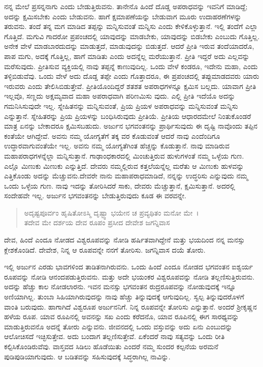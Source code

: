ನನ್ನ ಮೇಲೆ ಪ್ರಸನ್ನನಾಗು ಎಂದು ಬೇಡುತ್ತಿರುವನು. ತಾನೇನೊ ಹಿಂದೆ ದೊಡ್ಡ ಅಪರಾಧವನ್ನು ಇವನಿಗೆ ಮಾಡಿದ್ದೆ; ಅದನ್ನು ಕ್ಷಮಿಸಬೇಕು ಎಂದು ಬೇಡುವನು. ಹಾಗೆ ಕ್ಷಮಾಪಣೆಯನ್ನು ಬೇಡುವಾಗ ಮೂರು ಉದಾಹರಣೆಗಳನ್ನು ತರುವನು. ತಂದೆ ತನ್ನ ಮಗ ಮಾಡಿದ ತಪ್ಪನ್ನು ಮನ್ನಿಸುವಂತೆ ಮನ್ನಿಸು ಎಂದು ಕೇಳಿಕೊಳ್ಳುತ್ತಾನೆ. ಇಲ್ಲಿ ತಂದೆಗೆ ಎಲ್ಲಾ ಗೊತ್ತಿದೆ. ಮಗುವಿ ಗಾದರೋ ಪ್ರಪಂಚದಲ್ಲಿ ಯಾವುದನ್ನು ಮಾಡಬೇಕು, ಯಾವುದನ್ನು ಬಿಡಬೇಕು ಎಂಬುದು ಗೊತ್ತಿಲ್ಲ. ಅನೇಕ ವೇಳೆ ಮಾಡಬಾರದುದನ್ನು ಮಾಡುತ್ತದೆ, ಮಾಡುವುದನ್ನು ಬಿಡುತ್ತದೆ. ಆದರೆ ಪ್ರೀತಿ ಇರುವ ತಂದೆಯಾದರೊ, ಪಾಪ ಮಗು, ಅದಕ್ಕೆ ಗೊತ್ತಿಲ್ಲ, ಹಾಗೆ ಮಾಡಿತು ಎಂದು ಅದನ್ನೆಲ್ಲ ಮರೆಯುತ್ತಾನೆ. ಪ್ರೀತಿ ಇದ್ದರೆ ಅದು ಎಲ್ಲವನ್ನು ಮರೆಸುವುದು. ಪ್ರೀತಿಸುವ ವ್ಯಕ್ತಿಯಲ್ಲಿ ನಾವು ತಪ್ಪನ್ನೆ ಕಾಣುವುದಿಲ್ಲ. ಒಂದು ವೇಳೆ ಕಂಡರೂ, ಇದೇನು ಮಹಾ, ಎಂದು ತಳ್ಳಿಬಿಡುವೆವು. ಒಂದು ವೇಳೆ ಅದು ದೊಡ್ಡ ತಪ್ಪೇ ಎಂದು ಗೊತ್ತಾದರೂ, ಈ ಪ್ರಪಂಚದಲ್ಲಿ ತಪ್ಪುಮಾಡದವರು ಯಾರು ಇರುವರು ಎಂದು ತೇಲಿಸಿಬಿಡುತ್ತೇವೆ. ಪ್ರೀತಿಯೊಂದಿದ್ದರೆ ಶತಶತ ಅಪರಾಧಗಳನ್ನೂ ಕ್ಷಮಿಸ ಬಲ್ಲದು. ಯಾವಾಗ ಪ್ರೀತಿ ಇಲ್ಲವೊ, ಸಣ್ಣದು ಅಕ್ಷಮ್ಯವಾದ ಮಹಾ ಅಪರಾಧವಾಗಿ ಪರಿಣಮಿಸು ವುದು. ಎಲ್ಲಿ ಪ್ರೀತಿ ಇದೆಯೊ ಅದನ್ನು ಗಮನಿಸಿಸುವುದೇ ಇಲ್ಲ. ಸ್ನೇಹಿತನನ್ನು ಮನ್ನಿಸುವಂತೆ, ಪ್ರಿಯ ಪ್ರಿಯಳ ಅಪರಾಧವನ್ನು ಮನ್ನಿಸುವಂತೆ ಮನ್ನಿಸು ಎನ್ನುತ್ತಾನೆ. ಸ್ನೇಹಿತರನ್ನು ಪ್ರಿಯ ಪ್ರಿಯಳನ್ನು ಬಂಧಿಸಿರುವುದು ಪ್ರೀತಿಯೆ. ಪ್ರೀತಿಯ ಆಧಾರದಮೇಲೆ ನಿಂತುಕೊಂಡರೆ ಮಾತ್ರ ಏನನ್ನು ಬೇಕಾದರೂ ಕ್ಷಮಿಸಬಹುದು. ಅರ್ಜುನ ಭಗವಂತನನ್ನು ಪ್ರಾರ್ಥಿಸುವುದು ಈ ದೃಷ್ಟಿ ನಾವೊಂದು ತಪ್ಪಿನ ಕಂತೆಯೇ ಆಗಿದ್ದೇವೆ. ಅವನು ನಮ್ಮ ಯೋಗ್ಯತೆಗೆ ತಕ್ಕ ವರ ಕೊಡುವಂತೆ ಆದರೆ ನಾವು ಎಂದೆಂದಿಗೂ ಉದ್ಧಾರವಾಗುವಂತೆಯೇ ಇಲ್ಲ. ಅವನು ನಮ್ಮ ಯೋಗ್ಯತೆಗಿಂತ ಹೆಚ್ಚನ್ನು ಕೊಡುತ್ತಾನೆ. ನಾವು ಮಾಡಿರುವ ಮಹಾಪರಾಧಗಳನ್ನೆಲ್ಲಾ ಮನ್ನಿಸುತ್ತಾನೆ. ಗಾಢಾಂಧಕಾರದಲ್ಲಿ ಮಿಂಚುತ್ತಿರುವ ಹುಳುಗಳಂತೆ ನಮ್ಮ ಒಳ್ಳೆಯ ಗುಣ. ಎಲ್ಲೊ ಮಿಣುಕು ಮಿಣುಕು ಎನ್ನುತ್ತಿದೆ. ದೇವರು ನಮ್ಮಲ್ಲಿರುವ ಕತ್ತಲೆಯನ್ನೆಲ್ಲ ಮರೆತು ಆ ಮಿಣುಕು ಹುಳವನ್ನು ಎತ್ತಿಕೊಂಡು ಅದನ್ನು ಮೆಚ್ಚುವನು.ದೇವರೇ ನಾನು ಮಹಾಪರಾಧಮಾಡಿದೆ, ನನ್ನನ್ನು ಉದ್ಧರಿಸು ಎನ್ನುವುದು ನಮ್ಮ ಒಂದು ಒಳ್ಳೆಯ ಗುಣ. ನಾವು ಇದನ್ನು ತೋರಿಸಿದರೆ ಸಾಕು, ದೇವರು ಮೆಚ್ಚುತ್ತಾನೆ, ಕ್ಷಮಿಸುತ್ತಾನೆ. ಅದರಲ್ಲಿ ಸಂದೇಹವೇ ಇಲ್ಲ. ಅರ್ಜುನ ಭಗವಂತನನ್ನು ಬೇಡುತ್ತಿರುವುದು ಕೂಡ ಈ ವರವನ್ನೇ.

\begin{verse}
ಅದೃಷ್ಟಪೂರ್ವಂ ಹೃಷಿತೋಽಸ್ಮಿ ದೃಷ್ಟ್ವಾ ಭಯೇನ ಚ ಪ್ರವ್ಯಥಿತಂ ಮನೋ ಮೇ~।\\ತದೇವ ಮೇ ದರ್ಶಯ ದೇವ ರೂಪಂ ಪ್ರಸೀದ ದೇವೇಶ ಜಗನ್ನಿವಾಸ 
\end{verse}

ದೇವ, ಹಿಂದೆ ಎಂದೂ ನೋಡದ ವಿಶ್ವರೂಪವನ್ನು ನೋಡಿ ಹರ್ಷಿತವಾಗಿದ್ದೇನೆ ಮತ್ತು ಭಯದಿಂದ ನನ್ನ ಮನಸ್ಸು ಕ್ಲೇಶಕೊಂಡಿದೆ. ದೇವೇಶ, ನಿನ್ನ ಆ ರೂಪವನ್ನೇ ನನಗೆ ತೋರಿಸು. ಜಗನ್ನಿವಾಸ ದಯೆ ತೋರು.

ಇಲ್ಲಿ ಅರ್ಜುನ ಎರಡು ಭಾವಗಳಿಂದ ತಾಡಿತನಾಗಿರುವನು. ಒಂದು ಹಿಂದೆ ಎಂದೂ ನೋಡದ ಭಗವಂತನ ಐಶ್ವರ್ಯ ರೂಪವನ್ನು ನೋಡಿ ಆನಂದಪಡುತ್ತಿರುವನು. ಮತ್ತು ಅದೇ ಭಯಂಕರ ವಿಶ್ವರೂಪವನ್ನು ನೋಡಿ ತಲ್ಲಣಿಸುತ್ತಿರುವನು. ಅದನ್ನು ಹೆಚ್ಚು ಕಾಲ ನೋಡಲಾರನು. ಇವನ ಮನಸ್ಸು ಭಗವಂತನ ರುದ್ರರೂಪವನ್ನು ನೋಡುವುದಕ್ಕೆ ಇನ್ನೂ ಅಣಿಯಾಗಿಲ್ಲ. ತುಂಬಾ ಸಿಹಿಯಾಗಿರುವುದನ್ನು ನಾವು ಹೆಚ್ಚು ತಿನ್ನುವುದಕ್ಕೆ ಆಗುವುದಿಲ್ಲ. ಸ್ವಲ್ಪ ತಿನ್ನುವುದರೊಳಗೆ ವಾಂತಿ ಬರುವುದು. ಹಾಗಾಗಿದೆ ವಿಶ್ವರೂಪ ಅರ್ಜುನನಿಗೆ. ನಿನ್ನ ರೂಪವನ್ನೇ ತೋರಿಸು ಎನ್ನುತ್ತಾನೆ. ಅಂದರೆ ಶ‍್ರೀಕೃಷ್ಣನ ಹಳೆಯ ರೂಪ. ಯಾವ ರೂಪಿನಲ್ಲಿ ಅವನನ್ನು ಸಖ ಎಂದು ಕರೆದನೊ, ಯಾವ ರೂಪಿನಲ್ಲಿ ಈಗ ಸಾರಥ್ಯವನ್ನು ಮಾಡುತ್ತಿರುವನೊ ಅದನ್ನೆ ತೋರು ಎನ್ನುವನು. ಜೀವನದಲ್ಲಿ ಒಂದು ವಸ್ತುವನ್ನು ಅದು ಏನು ಎಂಬುದನ್ನು ಆಲೋಚಿಸದೆ ಇಚ್ಛಿಸುತ್ತೇವ. ಅದು ಬಂದಾಗ ತಲ್ಲಣಿಸುತ್ತೇವೆ. ಏಕೆಂದರೆ ನಾವು ಸತ್ಯವನ್ನು ಒಂದು ರೀತಿ ಕಲ್ಪಿಸಿಕೊಂಡಿರುವೆವು. ವಾಸ್ತವದ ಸಿಡಿಲು ಹೊಡೆಯಿತು ಎಂದರೆ ನಮ್ಮ ಸುಂದರ ಕಲ್ಪನೆಯ ಅರಮನೆ ಪುಡಿಪುಡಿಯಾಗುವುದು. ಆ ಬಡಿತವನ್ನು ಸಹಿಸುವುದಕ್ಕೆ ಸಿದ್ಧರಾಗಿಲ್ಲ ನಾವಿನ್ನು.

